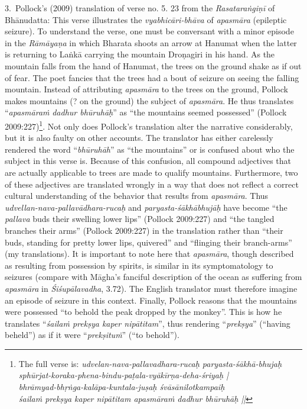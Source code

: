 3.~Pollock’s (2009) translation of verse no. 5. 23 from the \textsl{Rasataraṅgiṇī }of Bhānudatta: This verse illustrates the \textsl{vyabhicāri-bhāva} of \textsl{apasmāra }(epileptic seizure). To understand the verse, one must be conversant with a minor episode in the \textsl{Rāmāyaṇa} in which Bharata shoots an arrow at Hanumat when the latter is returning to Laṅkā carrying the mountain Droṇagiri in his hand. As the mountain falls from the hand of Hanumat, the trees on the ground shake as if out of fear. The poet fancies that the trees had a bout of seizure on seeing the falling mountain. Instead of attributing \textsl{apasmāra} to the trees on the ground, Pollock makes mountains (? on the ground) the subject of \textsl{apasmāra}. He thus translates “\textsl{apasmāraṁ} \textsl{dadhur bhūruhāḥ}” as “the mountains seemed possessed” (Pollock 2009:227)\footnote[1]{The full verse is: \textsl{udvelan-nava-pallavadhara-rucaḥ paryasta-śākhā-bhujaḥ}\\
\textsl{sphūrjat-koraka-phena-bindu-paṭala-vyākīrṇa-deha-śriyaḥ |}\\
\textsl{bhrāmyad-bhṛṅga-kalāpa-kuntala-juṣaḥ śvāsānilotkampaiḥ}\\
\textsl{śailaṁ prekṣya kaper nipātitam apasmāraṁ dadhur bhūruhāḥ ||}}. Not only does Pollock’s translation alter the narrative considerably, but it is also faulty on other accounts. The translator has either carelessly rendered the word “\textsl{bhūruhāh}” as “the mountains” or is confused about who the subject in this verse is. Because of this confusion, all compound adjectives that are actually applicable to trees are made to qualify mountains.  Furthermore, two of these adjectives are translated wrongly in a way that does not reflect a correct cultural understanding of the behavior that results from \textsl{apasmāra}. Thus \textsl{udvellan-nava-pallavādhara-rucaḥ} and \textsl{paryasta-śākhābhujāḥ} have become “the \textsl{pallava} buds their swelling lower lips” (Pollock 2009:227) and “the tangled branches their arms” (Pollock 2009:227) in the translation rather than “their buds, standing for pretty lower lips, quivered” and “flinging their branch-arms” (my translations). It is important to note here that \textsl{apasmāra}, though described as resulting from possession by spirits, is similar in its symptomatology to seizures (compare with Māgha’s fanciful description of the ocean as suffering from \textsl{apasmāra} in \textsl{Śiśupālavadha}, 3.72). The English translator must therefore imagine an episode of seizure in this context. Finally, Pollock reasons that the mountains were possessed “to behold the peak dropped by the monkey”. This is how he translates “\textsl{śailaṁ prekṣya kaper nipātitam}”, thus rendering “\textsl{prekṣya}” (“having beheld”) as if it were “\textsl{prekṣituṁ}” (“to behold”).

